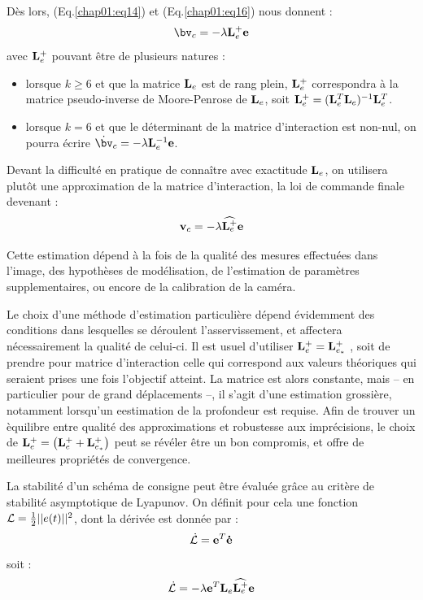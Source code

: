 D\`es lors, (Eq.\ref{chap01:eq14}) et (Eq.\ref{chap01:eq16}) nous 
donnent :
\begin{equation}
{\bv}_c = - \lambda {\bf L}^+_e {\bf e}
\label{chap01:eq17}
\end{equation}
avec ${\bf L}^+_e$ pouvant \^etre de plusieurs natures :
\begin{itemize}
 \item lorsque $k \geq 6$ et que la matrice ${\bf L}_e$ est de rang plein, 
${\bf L}^+_e$ correspondra \`a la matrice pseudo-inverse de Moore-Penrose de 
${\bf L}_e$, soit ${\bf L}^+_e = ({\bf L}_e^T{\bf L}_e)^{-1}{\bf L}_e^T$.
\item lorsque $k = 6$ et que le d\'eterminant de la matrice d'interaction est 
non-nul, on pourra \'ecrire $\dot {\bv}_c = - \lambda {\bf L}^{-1}_e {\bf e}$.
\end{itemize}

Devant la difficult\'e en pratique de connaître avec exactitude ${\bf 
L}_e$, on utilisera plut\^ot une approximation de la matrice d'interaction, la 
loi de commande finale devenant :
\begin{equation}
{\bf v}_c = - \lambda \widehat {{\bf L}_e^+} {\bf e} 
\label{chap01:eq18}
\end{equation}

Cette estimation d\'epend \`a la fois de la qualit\'e des mesures effectu\'ees 
dans l'image, des hypoth\`eses de mod\'elisation, de l'estimation de 
param\`etres supplementaires, ou encore de la calibration de la cam\'era.

Le choix d'une m\'ethode d'estimation particuli\`ere d\'epend \'evidemment des 
conditions dans lesquelles se d\'eroulent l'asservissement, et affectera 
n\'ecessai\-rement la qualit\'e de celui-ci. Il est usuel d'utiliser ${{\bf 
L}_e^+} = {{\bf L}_{e_*}^+}$ \cite{espiau1992}, soit de prendre pour matrice 
d'interaction celle qui correspond aux valeurs th\'eoriques qui seraient prises 
une fois l'objectif atteint. La matrice est alors constante, mais -- en 
particulier pour de grand d\'eplacements --, il s'agit d'une estimation 
grossi\`ere, notamment lorsqu'un eestimation de la profondeur est requise. Afin 
de trouver un \`equilibre entre qualit\'e des approximations et robustesse aux 
impr\'ecisions, le choix de ${{\bf L}_e^+} = \left ( {{\bf L}_{e}^+} + {{\bf 
L}_{e_*}^+} \right )$ \cite{malis2004} peut se r\'ev\'eler \^etre un bon 
compromis, et offre de meilleures propri\'et\'es de convergence.

La stabilit\'e d'un sch\'ema de consigne peut \^etre \'evalu\'ee gr\^ace au 
crit\`ere de stabilit\'e asymptotique de Lyapunov. On d\'efinit pour cela une 
fonction $\mathcal L = \frac 1 2 ||{\bf }e(t)||^2$, dont la d\'eriv\'ee est 
donn\'ee par :
\begin{equation}
\dot {\mathcal L} = {\bf e}^T {\bf \dot e} 
\label{chap01:eq18b}
\end{equation}
soit :
\begin{equation}
\dot {\mathcal L} = -\lambda {\bf e}^T {\bf L}_e \widehat {{\bf L}^+_e} {\bf e} 
\label{chap01:eq18c}
\end{equation}

